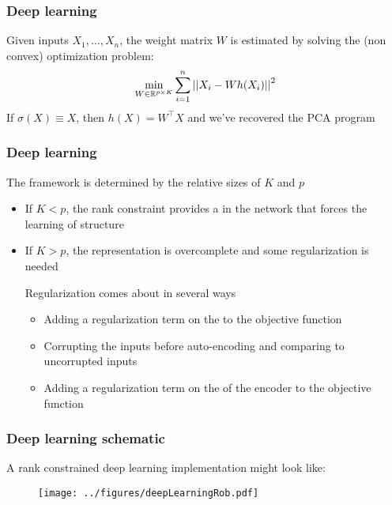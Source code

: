 \documentclass[12pt]{beamer}
\begin{document}
\begin{frame}[fragile]
\frametitle{Deep learning}
Given inputs $X_1,\ldots,X_n$, the weight matrix $W$ is estimated by solving the (non convex) optimization problem:
\[
\min_{W \in \mathbb{R}^{p\times K}} \sum_{i=1}^n \left|\left| X_i -Wh(X_i) \right|\right|^2
\]
If $\sigma(X) \equiv X$, then $h(X) = W^{\top}X$ and we've recovered the PCA program

\end{frame}

\begin{frame}[fragile]
\frametitle{Deep learning}
The framework is determined by the relative sizes of $K$ and $p$
\begin{itemize}
\item If $K < p$, 
the rank constraint provides a  in the network that forces the learning of structure

\item If $K > p$, the representation is overcomplete and some regularization is needed


Regularization comes about in several ways
\begin{itemize}
\item Adding a regularization term on the  to the objective function
\item Corrupting the inputs before auto-encoding and comparing to uncorrupted inputs 

\item Adding a regularization term on the  of the encoder to the objective function

\end{itemize}
\end{itemize}
\end{frame}

\begin{frame}[fragile]
\frametitle{Deep learning schematic}
A rank constrained deep learning implementation might look like:
\begin{figure}
\centering
\texttt{[image: ../figures/deepLearningRob.pdf]}
\end{figure}
\end{frame}
\end{document}
